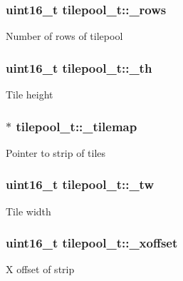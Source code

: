 \subsubsection[{\texorpdfstring{\+\_\+rows}{\_rows}}]{\setlength{\rightskip}{0pt plus 5cm}uint16\+\_\+t tilepool\+\_\+t\+::\+\_\+rows}\hypertarget{structtilepool__t_afd128c1a685a842642a9d64bf5073abe}{}\label{structtilepool__t_afd128c1a685a842642a9d64bf5073abe}
Number of rows of tilepool 
\subsubsection[{\texorpdfstring{\+\_\+th}{\_th}}]{\setlength{\rightskip}{0pt plus 5cm}uint16\+\_\+t tilepool\+\_\+t\+::\+\_\+th}\hypertarget{structtilepool__t_a93705a60174f75c507a2168ddae2f45e}{}\label{structtilepool__t_a93705a60174f75c507a2168ddae2f45e}
Tile height 
\subsubsection[{\texorpdfstring{\+\_\+tilemap}{\_tilemap}}]{$\ast$ tilepool\+\_\+t\+::\+\_\+tilemap}\hypertarget{structtilepool__t_a2bb67a7343217713e040b5b226b7dd32}{}\label{structtilepool__t_a2bb67a7343217713e040b5b226b7dd32}
Pointer to strip of tiles 
\subsubsection[{\texorpdfstring{\+\_\+tw}{\_tw}}]{\setlength{\rightskip}{0pt plus 5cm}uint16\+\_\+t tilepool\+\_\+t\+::\+\_\+tw}\hypertarget{structtilepool__t_af3e69db6b6fc3ea8a1cfbe57a7f03331}{}\label{structtilepool__t_af3e69db6b6fc3ea8a1cfbe57a7f03331}
Tile width 
\subsubsection[{\texorpdfstring{\+\_\+xoffset}{\_xoffset}}]{\setlength{\rightskip}{0pt plus 5cm}uint16\+\_\+t tilepool\+\_\+t\+::\+\_\+xoffset}\hypertarget{structtilepool__t_aa13b342aa0f301e0d9b160e17a1e23d8}{}\label{structtilepool__t_aa13b342aa0f301e0d9b160e17a1e23d8}
X offset of strip 
